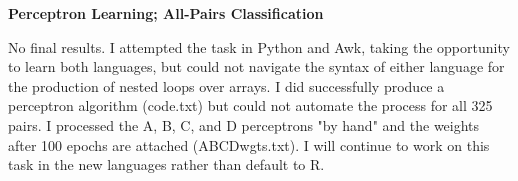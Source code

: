 \documentclass[12pt]{article}
\begin{document}
\begin{center}
\textbf{\normalsize Perceptron Learning; All-Pairs Classification}
\end{center}
No final results. I attempted the task in Python and Awk, taking the opportunity to learn both languages, but could not navigate the syntax of either language for the production of nested loops over arrays. I did successfully produce a perceptron algorithm (code.txt) but could not automate the process for all 325 pairs. I processed the A, B, C, and D perceptrons "by hand" and the weights after 100 epochs are attached (ABCDwgts.txt). I will continue to work on this task in the new languages rather than default to R. 


%
%
\end{document}
